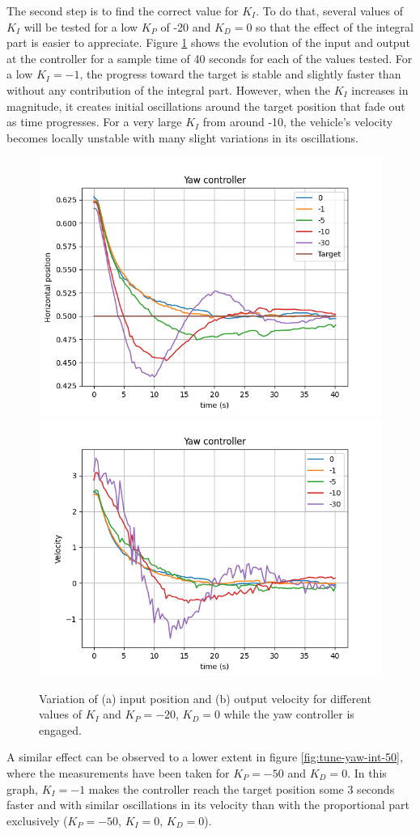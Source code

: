 The second step is to find the correct value for $K_I$. 
To do that, several values of $K_I$ will be tested for a low $K_P$ of -20 and $K_D=0$ so that the effect of the integral part is easier to appreciate. Figure \ref{fig:tune-yaw-int-20} shows the evolution of the input and output at the controller for a sample time of 40 seconds for each of the values tested. 
For a low $K_I=-1$, the progress toward the target is stable and slightly faster than without any contribution of the integral part.
However, when the $K_I$ increases in magnitude, it creates initial oscillations around the target position that fade out as time progresses. For a very large $K_I$ from around -10, the vehicle's velocity becomes locally unstable with many slight variations in its oscillations.

\begin{figure}
  \centering
  \includegraphics[width=.45\linewidth]{img/pid/yaw/yaw_pos_p20_int_d0.png}
  \includegraphics[width=.45\linewidth]{img/pid/yaw/yaw_vel_p20_int_d0.png}
  \caption{Variation of (a) input position and (b) output velocity for different values of $K_{I}$ and $K_P=-20$, $K_D=0$ while the yaw controller is engaged.}\label{fig:tune-yaw-int-20}
\end{figure}

A similar effect can be observed to a lower extent in figure \ref{fig:tune-yaw-int-50}, where the measurements have been taken for $K_P=-50$ and $K_D=0$. 
In this graph, $K_I=-1$ makes the controller reach the target position some 3 seconds faster and with similar oscillations in its velocity than with the proportional part exclusively ($K_P=-50$, $K_I=0$, $K_D=0$).

